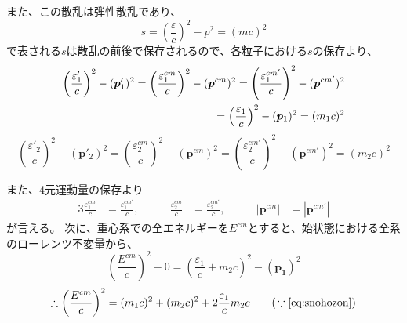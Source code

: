 \documentclass[a4paper,11pt,dvipdfmx]{jsarticle}
\begin{document}
また、この散乱は弾性散乱であり、
\begin{equation}
   s=\left(\frac{\varepsilon}{c}\right)^2-p^2=(mc)^2
\end{equation}
で表される$s$は散乱の前後で保存されるので、各粒子における$s$の保存より、
\begin{align}
     \left(\frac{\varepsilon'_{1}}{c}\right)^2-(\bm{p}'_{1})^2 = \left(\frac{\varepsilon^{cm}_{1}}{c}\right)^2-(\bm{p}^{cm})^2 =\left(\frac{\varepsilon^{cm'}_{1}}{c}\right)^2-(\bm{p}^{cm'})^2 \notag\\*
     =\left(\frac{\varepsilon_{1}}{c}\right)^2-(\bm{p}_{1})^2 = (m_{1}c)^2 \label{eq:snohozon}
\end{align}
\begin{equation}
    \left(\frac{\varepsilon'_{2}}{c}\right)^2-(\bm{p}'_{2})^2 = \left(\frac{\varepsilon^{cm}_{2}}{c}\right)^2-(\bm{p}^{cm})^2= 
     \left(\frac{\varepsilon^{cm'}_{2}}{c}\right)^2-(\bm{p}^{cm'})^2 =
     (m_{2}c)^2
\end{equation}

また、4元運動量の保存より
\begin{alignat}{3}
    \frac{\varepsilon^{cm}_{1}}{c} &= \frac{\varepsilon^{cm'}_{1}}{c}, &\qquad \frac{\varepsilon^{cm}_{2}}{c} &= \frac{\varepsilon^{cm'}_{2}}{c}, & \qquad 
    |\bm{p}^{cm}|&=|\bm{p}^{cm'}|
\end{alignat}
が言える。
次に、重心系での全エネルギーを$E^{cm}$とすると、始状態における全系のローレンツ不変量から、
\begin{equation*}
    \left(\frac{E^{cm}}{c}\right)^2 - 0 = \left(\frac{\varepsilon_{1}}{c} + m_{2}c\right)^{2} -(\bm{p_{1}})^2
\end{equation*}
\begin{equation}
   \therefore \left(\frac{E^{cm}}{c}\right)^2 = (m_{1}c)^{2} + (m_{2}c)^{2} + 2\frac{\varepsilon_{1}}{c}m_{2}c \qquad (\,\because\eqref{eq:snohozon})
\end{equation}
\end{document}
